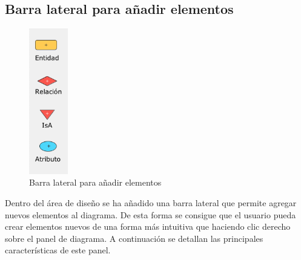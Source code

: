 \subsection{Barra lateral para añadir elementos}
\begin{figure}[H]
    \centering
    \includegraphics[width=0.15\textwidth]{img/barra_lateral.png}
    \caption{Barra lateral para añadir elementos}
\end{figure}
Dentro del área de diseño se ha añadido una barra lateral que permite agregar nuevos elementos al diagrama. De esta forma se consigue que el usuario pueda crear elementos nuevos de una forma más intuitiva que haciendo clic derecho sobre el panel de diagrama. A continuación se detallan las principales características de este panel.

